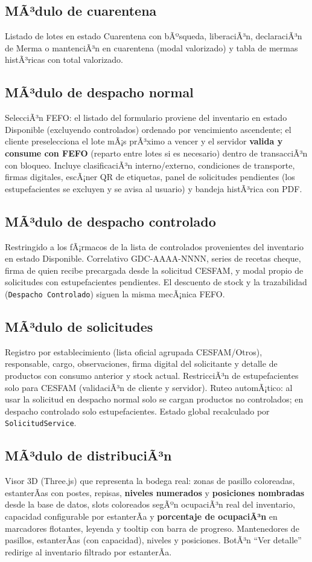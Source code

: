 ﻿\documentclass[a4paper, 12pt]{article}
\begin{document}
\subsection{MÃ³dulo de cuarentena}
Listado de lotes en estado Cuarentena con bÃºsqueda, liberaciÃ³n, declaraciÃ³n de Merma o mantenciÃ³n en cuarentena (modal valorizado) y tabla de mermas histÃ³ricas con total valorizado.

\subsection{MÃ³dulo de despacho normal}
SelecciÃ³n FEFO: el listado del formulario proviene del inventario en estado Disponible (excluyendo controlados) ordenado por vencimiento ascendente; el cliente preselecciona el lote mÃ¡s prÃ³ximo a vencer y el servidor \textbf{valida y consume con FEFO} (reparto entre lotes si es necesario) dentro de transacciÃ³n con bloqueo. Incluye clasificaciÃ³n interno/externo, condiciones de transporte, firmas digitales, escÃ¡ner QR de etiquetas, panel de solicitudes pendientes (los estupefacientes se excluyen y se avisa al usuario) y bandeja histÃ³rica con PDF.

\subsection{MÃ³dulo de despacho controlado}
Restringido a los fÃ¡rmacos de la lista de controlados provenientes del inventario en estado Disponible. Correlativo GDC-AAAA-NNNN, series de recetas cheque, firma de quien recibe precargada desde la solicitud CESFAM, y modal propio de solicitudes con estupefacientes pendientes. El descuento de stock y la trazabilidad (\texttt{Despacho Controlado}) siguen la misma mecÃ¡nica FEFO.

\subsection{MÃ³dulo de solicitudes}
Registro por establecimiento (lista oficial agrupada CESFAM/Otros), responsable, cargo, observaciones, firma digital del solicitante y detalle de productos con consumo anterior y stock actual. RestricciÃ³n de estupefacientes solo para CESFAM (validaciÃ³n de cliente y servidor). Ruteo automÃ¡tico: al usar la solicitud en despacho normal solo se cargan productos no controlados; en despacho controlado solo estupefacientes. Estado global recalculado por \texttt{SolicitudService}.

\subsection{MÃ³dulo de distribuciÃ³n}
Visor 3D (Three.js) que representa la bodega real: zonas de pasillo coloreadas, estanterÃ­as con postes, repisas, \textbf{niveles numerados} y \textbf{posiciones nombradas} desde la base de datos, slots coloreados segÃºn ocupaciÃ³n real del inventario, capacidad configurable por estanterÃ­a y \textbf{porcentaje de ocupaciÃ³n} en marcadores flotantes, leyenda y tooltip con barra de progreso. Mantenedores de pasillos, estanterÃ­as (con capacidad), niveles y posiciones. BotÃ³n ``Ver detalle'' redirige al inventario filtrado por estanterÃ­a.
\end{document}
